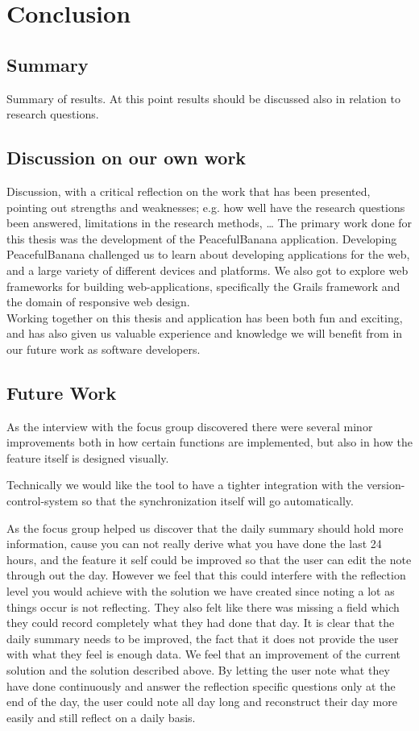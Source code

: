 \chapter{Conclusion}

\section{Summary}
Summary of results. At this point results should be discussed also in
relation to research questions.

\section{Discussion on our own work}
Discussion, with a critical reflection on the work that has been presented,
pointing out strengths and weaknesses; e.g. how well have the research questions been answered, limitations in the research methods, …
The primary work done for this thesis was the development of the PeacefulBanana application. Developing PeacefulBanana challenged us to learn about developing applications for the web, and a large variety of different devices and platforms. We also got to explore web frameworks for building web-applications, specifically the Grails framework and the domain of responsive web design. \\
Working together on this thesis and application has been both fun and exciting, and has also given us valuable experience and knowledge we will benefit from in our future work as software developers.

\section{Future Work}
As the interview with the focus group discovered there were several minor improvements both in how certain functions are implemented, but also in how the feature itself is designed visually. 

Technically we would like the tool to have a tighter integration with the version-control-system so that the synchronization itself will go automatically.

As the focus group helped us discover that the daily summary should hold more information, cause you can not really derive what you have done the last 24 hours, and the feature it self could be improved so that the user can edit the note through out the day. However we feel that this could interfere with the reflection level you would achieve with the solution we have created since noting a lot as things occur is not reflecting. They also felt like there was missing a field which they could record completely what they had done that day. It is clear that the daily summary needs to be improved, the fact that it does not provide the user with what they feel is enough data. We feel that an improvement of the current solution and the solution described above. By letting the user note what they have done continuously and answer the reflection specific questions only at the end of the day, the user could note all day long and reconstruct their day more easily and still reflect on a daily basis.

